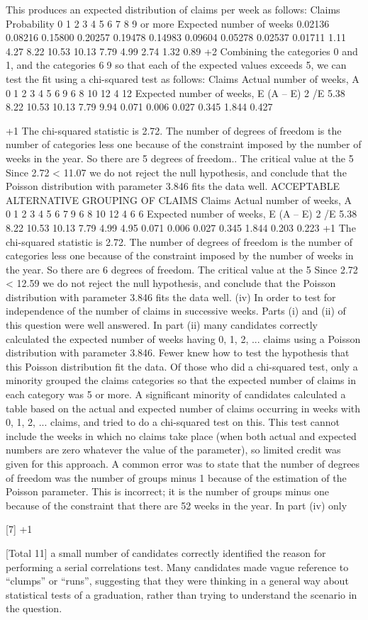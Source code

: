 \documentclass[a4paper,12pt]{article}
\begin{document}
This produces an expected distribution of claims per week as follows:
Claims
Probability
0
1
2
3
4
5
6
7
8
9 or more
Expected number of weeks
0.02136
0.08216
0.15800
0.20257
0.19478
0.14983
0.09604
0.05278
0.02537
0.01711
1.11
4.27
8.22
10.53
10.13
7.79
4.99
2.74
1.32
0.89
+2
Combining the categories 0 and 1, and the categories 69 so that
each of the expected values exceeds 5, we can test the fit using a
chi-squared test as follows:
Claims
Actual number
of weeks, A
01
2
3
4
5
69
6
8
10
12
4
12
Expected number
of weeks, E (A – E) 2 /E
5.38
8.22
10.53
10.13
7.79
9.94 0.071
0.006
0.027
0.345
1.844
0.427

+1
The chi-squared statistic is 2.72. 
The number of degrees of freedom is the number of categories less one
because of the constraint imposed by the number of weeks in the year. 
So there are 5 degrees of freedom.. 
The critical value at the 5%
Since 2.72 < 11.07 
we do not reject the null hypothesis, and conclude that the
Poisson distribution with parameter 3.846 fits the data well. 
ACCEPTABLE ALTERNATIVE GROUPING OF CLAIMS
Claims
Actual number
of weeks, A
01
2
3
4
5
6
79
6
8
10
12
4
6
6
Expected number
of weeks, E (A – E) 2 /E
5.38
8.22
10.53
10.13
7.79
4.99
4.95 0.071
0.006
0.027
0.345
1.844
0.203
0.223
+1
The chi-squared statistic is 2.72. 
The number of degrees of freedom is the number of categories less one
because of the constraint imposed by the number of weeks in the year. 
So there are 6 degrees of freedom. 
The critical value at the 5%
Since 2.72 < 12.59 
we do not reject the null hypothesis, and conclude that the
Poisson distribution with parameter 3.846 fits the data well.
(iv)
In order to test for independence of the number of claims in
successive weeks.
Parts (i) and (ii) of this question were well answered. In part (ii) many
candidates correctly calculated the expected number of weeks having 0, 1, 2,
... claims using a Poisson distribution with parameter 3.846. Fewer knew
how to test the hypothesis that this Poisson distribution fit the data. Of those
who did a chi-squared test, only a minority grouped the claims categories so
that the expected number of claims in each category was 5 or more. A
significant minority of candidates calculated a table based on the actual and
expected number of claims occurring in weeks with 0, 1, 2, ... claims, and
tried to do a chi-squared test on this. This test cannot include the weeks in
which no claims take place (when both actual and expected numbers are zero
whatever the value of the parameter), so limited credit was given for this
approach. A common error was to state that the number of degrees of
freedom was the number of groups minus 1 because of the estimation of the
Poisson parameter. This is incorrect; it is the number of groups minus one
because of the constraint that there are 52 weeks in the year. In part (iv) only

[7]
+1

[Total 11]
a small number of candidates correctly identified the reason for performing a
serial correlations test. Many candidates made vague reference to “clumps”
or “runs”, suggesting that they were thinking in a general way about statistical
tests of a graduation, rather than trying to understand the scenario in the
question.
\end{document}
